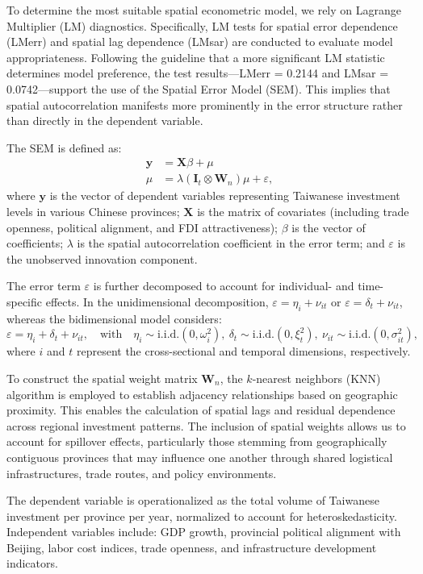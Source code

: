 \documentclass{article}
\begin{document}
To determine the most suitable spatial econometric model, we rely on Lagrange Multiplier (LM) diagnostics. Specifically, LM tests for spatial error dependence (LMerr) and spatial lag dependence (LMsar) are conducted to evaluate model appropriateness. Following the guideline that a more significant LM statistic determines model preference, the test results—LMerr = 0.2144 and LMsar = 0.0742—support the use of the Spatial Error Model (SEM). This implies that spatial autocorrelation manifests more prominently in the error structure rather than directly in the dependent variable.

The SEM is defined as:
\begin{align}
    \mathbf{y} &= \mathbf{X} \beta + \mu \\
    \mu &= \lambda (\mathbf{I}_t \otimes \mathbf{W}_n)\mu + \varepsilon,
\end{align}
where $\mathbf{y}$ is the vector of dependent variables representing Taiwanese investment levels in various Chinese provinces; $\mathbf{X}$ is the matrix of covariates (including trade openness, political alignment, and FDI attractiveness); $\beta$ is the vector of coefficients; $\lambda$ is the spatial autocorrelation coefficient in the error term; and $\varepsilon$ is the unobserved innovation component.

The error term $\varepsilon$ is further decomposed to account for individual- and time-specific effects. In the unidimensional decomposition, $\varepsilon = \eta_i + \nu_{it}$ or $\varepsilon = \delta_t + \nu_{it}$, whereas the bidimensional model considers:
\[
\varepsilon = \eta_i + \delta_t + \nu_{it}, \quad \text{with} \quad \eta_i \sim \text{i.i.d.}(0, \omega_i^2),\ \delta_t \sim \text{i.i.d.}(0, \xi_t^2),\ \nu_{it} \sim \text{i.i.d.}(0, \sigma_{it}^2),
\]
where $i$ and $t$ represent the cross-sectional and temporal dimensions, respectively.

To construct the spatial weight matrix $\mathbf{W}_n$, the $k$-nearest neighbors (KNN) algorithm is employed to establish adjacency relationships based on geographic proximity. This enables the calculation of spatial lags and residual dependence across regional investment patterns. The inclusion of spatial weights allows us to account for spillover effects, particularly those stemming from geographically contiguous provinces that may influence one another through shared logistical infrastructures, trade routes, and policy environments.

The dependent variable is operationalized as the total volume of Taiwanese investment per province per year, normalized to account for heteroskedasticity. Independent variables include: GDP growth, provincial political alignment with Beijing, labor cost indices, trade openness, and infrastructure development indicators.
\end{document}
